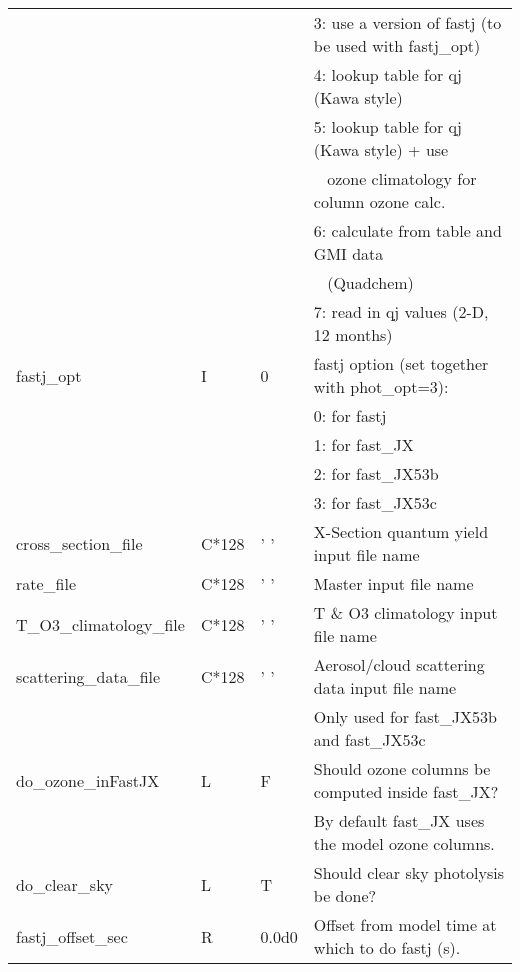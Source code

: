 {\begin{landscape}
\begin{center}
\begin{longtable}{|l|l|l|l|}
                 &   &   &                               3:  use a version of fastj (to be used with fastj\_opt)  \\
                 &   &   &                               4:  lookup table for qj (Kawa style)  \\
                 &   &   &                               5:  lookup table for qj (Kawa style) + use  \\
                 &   &   & \mbox{  } ozone climatology for column ozone calc.  \\
                 &   &   &                               6:  calculate from table and GMI data  \\
                 &   &   & \mbox{  } (Quadchem) \\
                 &   &   &                               7:  read in qj values (2-D, 12 months)  \\ \hline 
fastj\_opt             & I & 0 & fastj option (set together with phot\_opt=3):  \\
                 &   &   &                               0:  for fastj  \\
                 &   &   &                               1:  for fast\_JX  \\
                 &   &   &                               2:  for fast\_JX53b  \\ 
                 &   &   &                               3:  for fast\_JX53c  \\ \hline
cross\_section\_file  & C*128 & ' '       &  X-Section quantum yield input file name \\ \hline
rate\_file            & C*128 & ' '       &  Master input file name \\ \hline
T\_O3\_climatology\_file & C*128 & ' '    &  T \& O3 climatology input file name \\ \hline
scattering\_data\_file & C*128 & ' ' & Aerosol/cloud scattering data input file name \\ 
                       &       &     & Only used for fast\_JX53b and fast\_JX53c  \\ \hline
do\_ozone\_inFastJX    & L &  F  & Should ozone columns be computed inside fast\_JX?  \\ 
                       &   &     & By default fast\_JX uses the model ozone columns.  \\ \hline
do\_clear\_sky         & L &  T  & Should clear sky photolysis  be done?  \\ \hline
fastj\_offset\_sec     & R &  0.0d0    & Offset from model time at which to do fastj (s).  \\ \hline

\end{longtable}
\end{center}
\end{landscape}}

